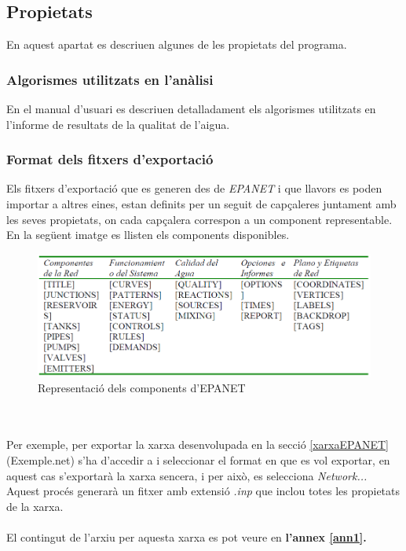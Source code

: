 \documentclass[12pt]{article}
\begin{document}
\clearpage
\subsection{Propietats}
En aquest apartat es descriuen algunes de les propietats del programa.

\subsubsection{Algorismes utilitzats en l'anàlisi}
En el manual d'usuari\cite{DocuEpanet} es descriuen detalladament els algorismes utilitzats en l'informe de resultats de la qualitat de l'aigua.

\subsubsection{Format dels fitxers d'exportació}
Els fitxers d'exportació que es generen des de \textit{EPANET} i que llavors es poden importar a altres eines, estan definits per un seguit de capçaleres juntament amb les seves propietats, on cada capçalera correspon a un component representable. En la següent imatge es llisten els components disponibles.
\begin{figure}[h!]
	\centering
	\includegraphics[scale=.5]{imatges/epanet/components.png}
	\caption{Representació dels components d'EPANET}
\end{figure}
\\\\Per exemple, per exportar la xarxa desenvolupada en la secció \ref{xarxaEPANET} (Exemple.net) s'ha d'accedir a  i seleccionar el format en que es vol exportar, en aquest cas s'exportarà la xarxa sencera, i per això, es selecciona \textit{Network...} Aquest procés generarà un fitxer amb extensió \textit{.inp} que inclou totes les propietats de la xarxa.
\\\\El contingut de l'arxiu per aquesta xarxa es pot veure en \textbf{l'annex \ref{ann1}.}
\end{document}
